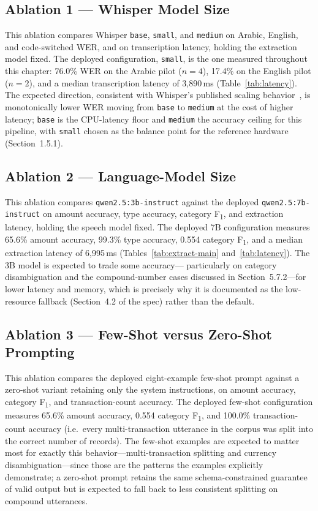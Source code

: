 \subsection{Ablation 1 --- Whisper Model Size}

This ablation compares Whisper \texttt{base}, \texttt{small}, and
\texttt{medium} on Arabic, English, and code-switched WER, and on
transcription latency, holding the extraction model fixed. The deployed
configuration, \texttt{small}, is the one measured throughout this chapter:
76.0\% WER on the Arabic pilot ($n=4$), 17.4\% on the English pilot ($n=2$),
and a median transcription latency of 3{,}890\,ms (Table~\ref{tab:latency}).
The expected direction, consistent with Whisper's published scaling
behavior~\cite{radford2023whisper}, is monotonically lower WER moving from
\texttt{base} to \texttt{medium} at the cost of higher latency; \texttt{base}
is the CPU-latency floor and \texttt{medium} the accuracy ceiling for this
pipeline, with \texttt{small} chosen as the balance point for the reference
hardware (Section~1.5.1).

\subsection{Ablation 2 --- Language-Model Size}

This ablation compares \texttt{qwen2.5:3b-instruct} against the deployed
\texttt{qwen2.5:7b-instruct} on amount accuracy, type accuracy, category
F\textsubscript{1}, and extraction latency, holding the speech model fixed.
The deployed 7B configuration measures 65.6\% amount accuracy, 99.3\% type
accuracy, 0.554 category F\textsubscript{1}, and a median extraction latency
of 6{,}995\,ms (Tables~\ref{tab:extract-main} and~\ref{tab:latency}). The
3B model is expected to trade some accuracy--- particularly on category
disambiguation and the compound-number cases discussed in
Section~5.7.2---for lower latency and memory, which is precisely why it is
documented as the low-resource fallback (Section~4.2 of the spec) rather than
the default.

\subsection{Ablation 3 --- Few-Shot versus Zero-Shot Prompting}

This ablation compares the deployed eight-example few-shot prompt against a
zero-shot variant retaining only the system instructions, on amount accuracy,
category F\textsubscript{1}, and transaction-count accuracy. The deployed
few-shot configuration measures 65.6\% amount accuracy, 0.554 category
F\textsubscript{1}, and 100.0\% transaction-count accuracy (i.e.\ every
multi-transaction utterance in the corpus was split into the correct number
of records). The few-shot examples are expected to matter most for exactly
this behavior---multi-transaction splitting and currency disambiguation---since
those are the patterns the examples explicitly demonstrate; a zero-shot
prompt retains the same schema-constrained guarantee of valid output but is
expected to fall back to less consistent splitting on compound utterances.

